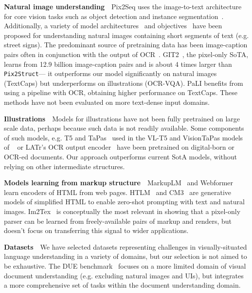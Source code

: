 \documentclass{article} %
\newcommand\ourmodel{{\texttt{Pix2Struct}}}
\begin{document}
\textbf{Natural image understanding}~~Pix2Seq uses the image-to-text architecture for core vision tasks such as object detection and instance segmentation~\citep{chen2022unified,chen2021pix2seq}. Additionally, a variety of model architectures~\citep{singh2019towards,sidorov2019textcaps,wang2020multimodal} and objectives~\citep{yang2021tap} have been proposed for understanding natural images containing short segments of text (e.g. street signs). The predominant source of pretraining data has been image-caption pairs often in conjunction with the output of OCR~\citep{pali,yang2021tap}. GIT2~\citep{wang2022git}, the pixel-only SoTA, learns from 12.9 billion image-caption pairs and is about 4 times larger than \ourmodel--- it outperforms our model significantly on natural images (TextCaps) but underperforms on illustrations (OCR-VQA). PaLI benefits from using a pipeline with OCR, obtaining higher performance on TextCaps. These methods have not been evaluated on more text-dense input domains.

\textbf{Illustrations}~~Models for illustrations have not been fully pretrained on large scale data, perhaps because such data is not readily available. Some components of such models, e.g. T5 and TaPas~\citep{eisenschlos-etal-2020-understanding} used in the VL-T5 and VisionTaPas models of ~\citet{masry-etal-2022-chartqa} or LATr's OCR output encoder~\citep{biten2022latr} have been pretrained on digital-born or OCR-ed documents. Our approach outperforms current SotA models, without relying on other intermediate structures.

\textbf{Models learning from markup structure}~~MarkupLM~\citep{li2021markuplm} and Webformer~\citep{wang2022webformer} learn encoders of HTML from web pages. HTLM~\citep{aghajanyan2021htlm} and  CM3~\citep{aghajanyan2022cm3} are generative models of simplified HTML to enable zero-shot prompting with text and natural images. Im2Tex~\citep{deng2017image} is conceptually the most relevant in showing that a pixel-only parser can be learned from freely-available pairs of markup and renders, but doesn't focus on transferring this signal to wider applications.

\textbf{Datasets}~~We have selected datasets representing challenges in visually-situated language understanding in a variety of domains, but our selection is not aimed to be exhaustive. The DUE benchmark~\citep{borchmann2021due} focuses on a more limited domain of visual document understanding (e.g. excluding natural images and UIs), but integrates a more comprehensive set of tasks within the document understanding domain.
\end{document}
